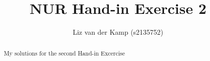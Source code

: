 \documentclass[a4paper,10pt]{article}
\title{NUR Hand-in Exercise 2}
\author{Liz van der Kamp (s2135752)}
\begin{document}
\maketitle

\begin{abstract}
 My solutions for the second Hand-in Excercise
\end{abstract}




\end{document}

